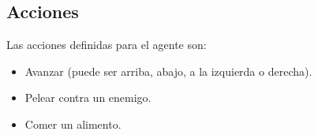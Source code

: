 \subsection{Acciones}

Las acciones definidas para el agente son:

\begin{itemize}
\item Avanzar (puede ser arriba, abajo, a la izquierda o derecha).
\item Pelear contra un enemigo.
\item Comer un alimento.
\end{itemize}

